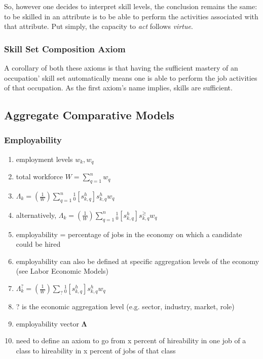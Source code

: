 \documentclass{elsarticle} %
\begin{document}
So, however one decides to interpret skill levels, the conclusion remains the same: to be skilled in an attribute is to be able to perform the activities associated with that attribute. Put simply, the capacity to \textit{act} follows \textit{virtue}.

\subsubsection{Skill Set Composition Axiom}


A corollary of both these axioms is that having the sufficient mastery of an occupation' skill set automatically means one is able to perform the job activities of that occupation. 
As the first axiom's name implies, skills are sufficient.


\subsubsection{}

\subsection{Aggregate Comparative Models}
\subsubsection{Employability}
\begin{enumerate}
    \item employment levels $w_k, w_q$
    \item total workforce $W = \sum_{q=1}^{n}{w_q}$
    \item $\Lambda_k = \left(\frac{1}{W}\right) \sum_{q=1}^{n}{_{0}^{1}[s_{k,q}^{h}] s_{k,q}^{h} w_q}$
    \item alternatively, $\Lambda_k = \left(\frac{1}{W}\right)
              \sum_{q=1}^{n}{_{0}^{1}[s_{k,q}^{h}] s_{k,q}^{\geq} w_q}$
    \item employability = percentage of jobs in the economy on which a candidate could be
          hired
    \item employability can also be defined at specific aggregation levels of the economy
          (see Labor Economic Models)
    \item $\Lambda_{k}^{?} = \left(\frac{1}{W}\right) \sum_{?}{_{0}^{1}[s_{k,q}^{h}] s_{k,q}^{h} w_q}$
    \item ? is the economic aggregation level (e.g. sector, industry, market, role)
    \item employability vector $\boldsymbol{\Lambda}$
    \item need to define an axiom to go from x percent of hireability in one job of a
          class to hireability in x percent of jobs of that class
\end{enumerate}
\end{document}

